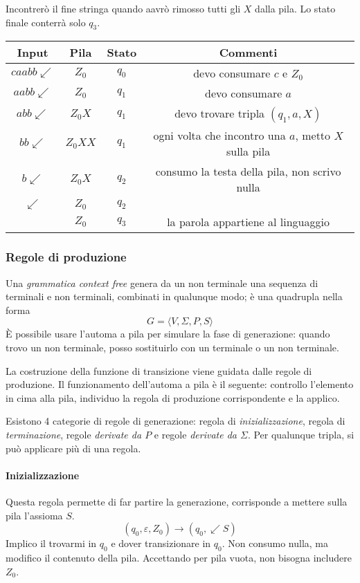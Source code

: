 \documentclass[11pt]{article}
\begin{document}
Incontrerò il fine stringa quando aavrò rimosso tutti gli $X$ dalla pila. Lo stato finale conterrà solo $q_3$.
\begin{center}
    \begin{tabular}{ |c|c|c|c| }
     \hline
     Input & Pila & Stato & Commenti \\ 
     \hline\hline
     $caabb\swarrow$ & $Z_0$ & $q_0$ & devo consumare $c$ e $Z_0$ \\ 
     $aabb\swarrow$ & $Z_0$ & $q_1$ & devo consumare $a$ \\ 
     $abb\swarrow$ & $Z_0X$ & $q_1$ & devo trovare tripla $(q_1,a,X)$ \\ 
     $bb\swarrow$ & $Z_0XX$ & $q_1$ & ogni volta che incontro una $a$, metto $X$ sulla pila \\ 
     $b\swarrow$ & $Z_0X$ & $q_2$ & consumo la testa della pila, non scrivo nulla \\ 
     $\swarrow$ & $Z_0$ & $q_2$ & \\ 
     $ $ & $Z_0$ & $q_3$ & la parola appartiene al linguaggio \\ 
     \hline
    \end{tabular}
\end{center}
\subsubsection{Regole di produzione}
Una \textit{grammatica context free} genera da un non terminale una sequenza di terminali e non terminali, combinati in qualunque 
modo; è una quadrupla nella forma 
\begin{equation*}
    G=\langle V,\Sigma,P,S\rangle
\end{equation*}
È possibile usare l'automa a pila per simulare la fase di generazione: quando trovo un non terminale, posso sostituirlo 
con un terminale o un non terminale.

La costruzione della funzione di transizione viene guidata dalle regole di produzione.
Il funzionamento dell'automa a pila è il seguente: controllo l'elemento in cima alla pila, individuo la regola di produzione 
corrispondente e la applico. 

Esistono 4 categorie di regole di generazione: regola di \textit{inizializzazione}, regola di \textit{terminazione}, 
regole \textit{derivate da $P$} e regole \textit{derivate da $\Sigma$}.
Per qualunque tripla, si può applicare più di una regola.
\paragraph*{Inizializzazione}
Questa regola permette di far partire la generazione, corrisponde a mettere sulla pila l'assioma $S$.
\begin{equation*}
    (q_0,\varepsilon,Z_0)\rightarrow(q_0,\swarrow S)
\end{equation*}
Implico il trovarmi in $q_0$ e dover transizionare in $q_0$. Non consumo nulla, ma modifico il contenuto della pila. 
Accettando per pila vuota, non bisogna includere $Z_0$.
\end{document}
